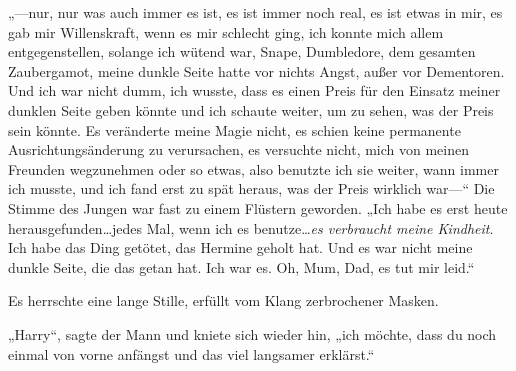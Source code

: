 „—nur, nur was auch immer es ist, es ist immer noch real, es ist etwas in mir, es gab mir Willenskraft, wenn es mir schlecht ging, ich konnte mich allem entgegenstellen, solange ich wütend war, Snape, Dumbledore, dem gesamten Zaubergamot, meine dunkle Seite hatte vor nichts Angst, außer vor Dementoren. Und ich war nicht dumm, ich wusste, dass es einen Preis für den Einsatz meiner dunklen Seite geben könnte und ich schaute weiter, um zu sehen, was der Preis sein könnte. Es veränderte meine Magie nicht, es schien keine permanente Ausrichtungsänderung zu verursachen, es versuchte nicht, mich von meinen Freunden wegzunehmen oder so etwas, also benutzte ich sie weiter, wann immer ich musste, und ich fand erst zu spät heraus, was der Preis wirklich war—“
Die Stimme des Jungen war fast zu einem Flüstern geworden.
„Ich habe es erst heute herausgefunden…jedes Mal, wenn ich es benutze…\emph{es verbraucht meine Kindheit}. Ich habe das Ding getötet, das Hermine geholt hat. Und es war nicht meine dunkle Seite, die das getan hat. Ich war es. Oh, Mum, Dad, es tut mir leid.“

Es herrschte eine lange Stille, erfüllt vom Klang zerbrochener Masken.

„Harry“, sagte der Mann und kniete sich wieder hin, „ich möchte, dass du noch einmal von vorne anfängst und das viel langsamer erklärst.“



